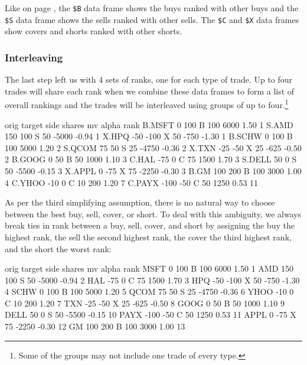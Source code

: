 \documentclass{article}
\begin{document}
Like on page \pageref{Creating raw ranks for a long-only portfolio},
the \texttt{\$B} data frame shows the buys ranked with other buys and
the \texttt{\$S} data frame shows the sells ranked with other sells.
The \texttt{\$C} and \texttt{\$X} data frames show covers and shorts
ranked with other shorts.

\subsubsection{Interleaving}

The last step left us with 4 sets of ranks, one
for each type of trade.  Up to four trades will share each rank when
we combine these data frames to form a list of overall rankings and
the trades will be interleaved using groups of up to
four.\protect\footnote{Some of the groups may not include one trade of
every type.}

\begin{Schunk}
\begin{Soutput}
       orig target side shares    mv alpha rank
B.MSFT    0    100    B    100  6000  1.50    1
S.AMD   150    100    S     50 -5000 -0.94    1
X.HPQ   -50   -100    X     50  -750 -1.30    1
B.SCHW    0    100    B    100  5000  1.20    2
S.QCOM   75     50    S     25 -4750 -0.36    2
X.TXN   -25    -50    X     25  -625 -0.50    2
B.GOOG    0     50    B     50  1000  1.10    3
C.HAL   -75      0    C     75  1500  1.70    3
S.DELL   50      0    S     50 -5500 -0.15    3
X.APPL    0    -75    X     75 -2250 -0.30    3
B.GM    100    200    B    100  3000  1.00    4
C.YHOO  -10      0    C     10   200  1.20    7
C.PAYX -100    -50    C     50  1250  0.53   11
\end{Soutput}
\end{Schunk}

As per the third simplifying assumption, there is no natural way to
choose between the best buy, sell, cover, or short.  To deal with this
ambiguity, we always break ties in rank between a buy, sell, cover,
and short by assigning the buy the highest rank, the sell the second
highest rank, the cover the third highest rank, and the short the
worst rank:

\begin{Schunk}
\begin{Soutput}
     orig target side shares    mv alpha rank
MSFT    0    100    B    100  6000  1.50    1
AMD   150    100    S     50 -5000 -0.94    2
HAL   -75      0    C     75  1500  1.70    3
HPQ   -50   -100    X     50  -750 -1.30    4
SCHW    0    100    B    100  5000  1.20    5
QCOM   75     50    S     25 -4750 -0.36    6
YHOO  -10      0    C     10   200  1.20    7
TXN   -25    -50    X     25  -625 -0.50    8
GOOG    0     50    B     50  1000  1.10    9
DELL   50      0    S     50 -5500 -0.15   10
PAYX -100    -50    C     50  1250  0.53   11
APPL    0    -75    X     75 -2250 -0.30   12
GM    100    200    B    100  3000  1.00   13
\end{Soutput}
\end{Schunk}
\end{document}
